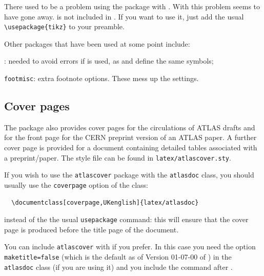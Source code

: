 There used to be a problem using the  package with .
With  this problem seems to have gone away.
 is not included in .
If you want to use it, just add the usual \verb|\usepackage{tikz}| to your preamble.

Other packages that have been used at some point include:
\begin{description}\setlength{\parskip}{0pt}\setlength{\itemsep}{0pt}
\item {}: needed to avoid errors if  is used, 
  as  and  define the same symbols;
\item \texttt{footmisc}: extra footnote options. 
  These mess up the  settings.
\end{description}


\subsection{Cover pages}
\label{sec:cover}

The package also provides cover pages for the circulations of ATLAS drafts and 
for the front page for the CERN preprint version of an ATLAS paper.
A further cover page is provided for a document containing detailed tables associated with a preprint/paper.
The style file can be found in \texttt{latex/atlascover.sty}.

If you wish to use the \texttt{atlascover} package with the 
\texttt{atlasdoc} class, you should usually use the \texttt{coverpage} option of the class:
\begin{verbatim}
  \documentclass[coverpage,UKenglish]{latex/atlasdoc}
\end{verbatim}
instead of the the usual \texttt{usepackage} command: this will ensure
that the cover page is produced before the title page of the document.

You can include \texttt{atlascover} with  if you prefer.
In this case you need the option \texttt{maketitle=false}
(which is the default as of Version 01-07-00 of ) in the \texttt{atlasdoc} class
(if you are using it)
and you include the  command after \verb||.

